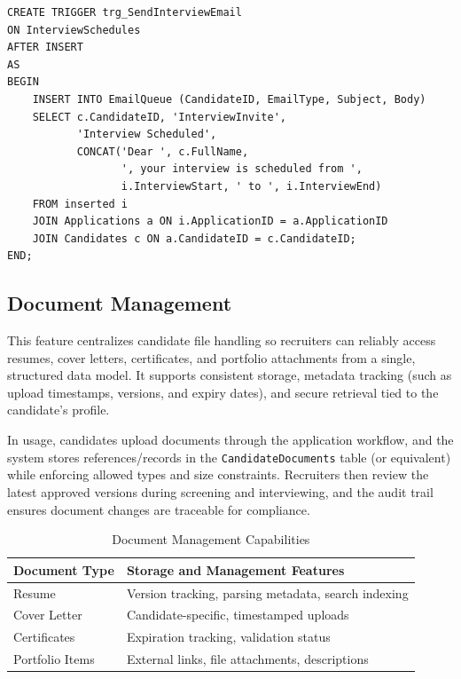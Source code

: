 \documentclass[11pt,a4paper]{article}
\begin{document}
\begin{verbatim}
CREATE TRIGGER trg_SendInterviewEmail
ON InterviewSchedules
AFTER INSERT
AS
BEGIN
    INSERT INTO EmailQueue (CandidateID, EmailType, Subject, Body)
    SELECT c.CandidateID, 'InterviewInvite',
           'Interview Scheduled',
           CONCAT('Dear ', c.FullName,
                  ', your interview is scheduled from ',
                  i.InterviewStart, ' to ', i.InterviewEnd)
    FROM inserted i
    JOIN Applications a ON i.ApplicationID = a.ApplicationID
    JOIN Candidates c ON a.CandidateID = c.CandidateID;
END;
\end{verbatim}

\subsection{Document Management}
\noindent
This feature centralizes candidate file handling so recruiters can reliably access resumes, cover letters, certificates, and portfolio attachments from a single, structured data model. It supports consistent storage, metadata tracking (such as upload timestamps, versions, and expiry dates), and secure retrieval tied to the candidate’s profile.

In usage, candidates upload documents through the application workflow, and the system stores references/records in the \texttt{CandidateDocuments} table (or equivalent) while enforcing allowed types and size constraints. Recruiters then review the latest approved versions during screening and interviewing, and the audit trail ensures document changes are traceable for compliance.

\begin{table}[H]
    \centering
    \begin{tabularx}{\textwidth}{|l|X|}
        \hline
        \rowcolor{tableheader}
        \textbf{Document Type} & \textbf{Storage and Management Features} \\
        \hline
        Resume & Version tracking, parsing metadata, search indexing \\
        \hline
        Cover Letter & Candidate-specific, timestamped uploads \\
        \hline
        Certificates & Expiration tracking, validation status \\
        \hline
        Portfolio Items & External links, file attachments, descriptions \\
        \hline
    \end{tabularx}
    \caption{Document Management Capabilities}
\end{table}
\end{document}
